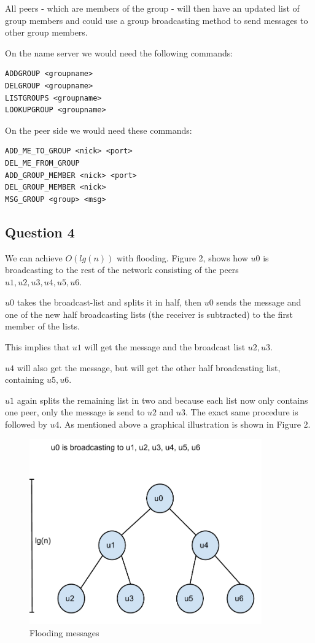All peers - which are members of the group - will then have an updated list of
group members and could use a group broadcasting method to send messages to
other group members.

On the name server we would need the following commands:
\begin{lstlisting}
ADDGROUP <groupname>
DELGROUP <groupname>
LISTGROUPS <groupname>
LOOKUPGROUP <groupname>
\end{lstlisting}

On the peer side we would need these commands:
\begin{lstlisting}
ADD_ME_TO_GROUP <nick> <port>
DEL_ME_FROM_GROUP
ADD_GROUP_MEMBER <nick> <port>
DEL_GROUP_MEMBER <nick>
MSG_GROUP <group> <msg>
\end{lstlisting}

\subsection{Question 4}
We can achieve $O(lg(n))$ with flooding. Figure 2, shows how $u0$ is
broadcasting to the rest of the network consisting of the peers
$u1,u2,u3,u4,u5,u6$.

$u0$ takes the broadcast-list and splits it in half, then $u0$ sends the
message and one of the new half broadcasting lists (the receiver
is subtracted) to the first member of the lists.

This implies that $u1$ will get the message and the broadcast list $u2, u3$.

$u4$ will also get the message, but will get the other half broadcasting list,
containing  $u5,u6$.

$u1$ again splits the remaining list in two and because each list now only
contains one peer, only the message is send to $u2$ and $u3$. The exact same
procedure is followed by $u4$. As mentioned above a graphical illustration is
shown in Figure 2.

\begin{figure}[!h]
    \centering
    \includegraphics[width=10cm]{graphics/flooding}
    \caption{Flooding messages}
\end{figure}

